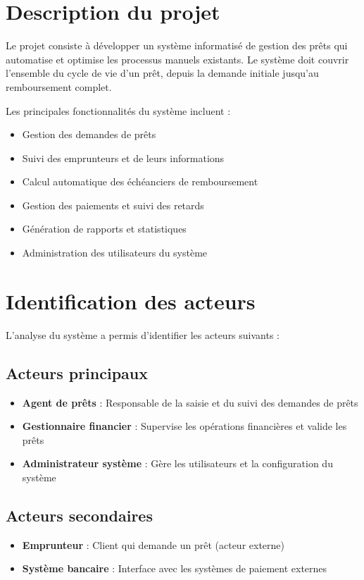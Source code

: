 \documentclass[12pt,a4paper]{report}
\begin{document}
\section{Description du projet}

Le projet consiste à développer un système informatisé de gestion des prêts qui automatise et optimise les processus manuels existants. Le système doit couvrir l'ensemble du cycle de vie d'un prêt, depuis la demande initiale jusqu'au remboursement complet.

Les principales fonctionnalités du système incluent :
\begin{itemize}
    \item Gestion des demandes de prêts
    \item Suivi des emprunteurs et de leurs informations
    \item Calcul automatique des échéanciers de remboursement
    \item Gestion des paiements et suivi des retards
    \item Génération de rapports et statistiques
    \item Administration des utilisateurs du système
\end{itemize}

\section{Identification des acteurs}

L'analyse du système a permis d'identifier les acteurs suivants :

\subsection{Acteurs principaux}
\begin{itemize}
    \item \textbf{Agent de prêts} : Responsable de la saisie et du suivi des demandes de prêts
    \item \textbf{Gestionnaire financier} : Supervise les opérations financières et valide les prêts
    \item \textbf{Administrateur système} : Gère les utilisateurs et la configuration du système
\end{itemize}

\subsection{Acteurs secondaires}
\begin{itemize}
    \item \textbf{Emprunteur} : Client qui demande un prêt (acteur externe)
    \item \textbf{Système bancaire} : Interface avec les systèmes de paiement externes
\end{itemize}
\end{document}
